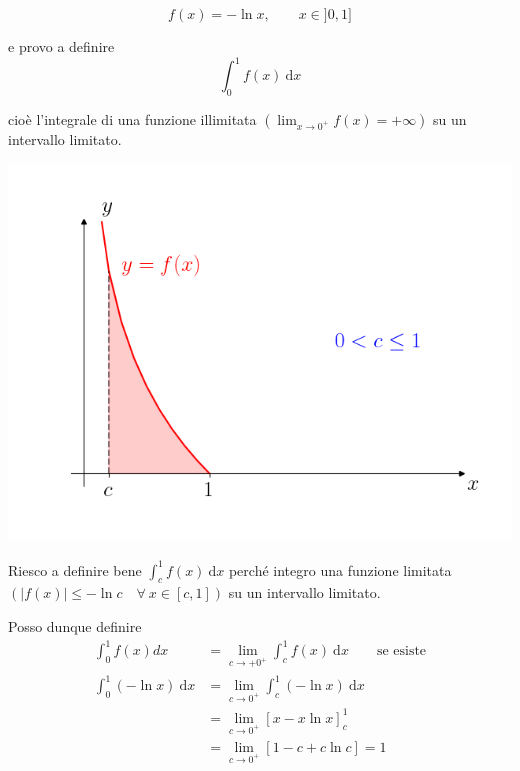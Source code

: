 	
\begin{exbar}
\begin{example}
	\begin{equation*}
		f(x)=-\ln x, \qquad x \in ]0,1]
	\end{equation*}
	
	e provo a definire 
	\begin{equation*}
		\int_{0}^{1} f(x) \ \mathrm{d}x
	\end{equation*}
	
	cioè l'integrale di una funzione illimitata $\left( \lim_{x \rightarrow 0^+} f(x) = + \infty \right)$ su un intervallo limitato.
	\begin{center}
		\includegraphics[width=0.75\linewidth]{integrali_impropri/pag79}
		\label{fig:pag79}
	\end{center}
	
	Riesco a definire bene $\int_{c}^{1} f(x) \ \mathrm{d}x$ perché integro una funzione limitata
	$\left( |f(x)|\leq -\ln c \quad \forall \ x \in [c,1] \right)$ su un intervallo limitato.
	
	Posso dunque definire
	\begin{align*}
		\int_{0}^{1} f(x)dx 
		&= \lim_{c\rightarrow +0^+} \int_{c}^{1} f(x) \ \mathrm{d}x \qquad \text{se esiste}
		\\
		\int_{0}^{1}(-\ln x) \ \mathrm{d}x 
		&= \lim_{c \rightarrow 0^+} \int_{c}^{1} (-\ln x) \ \mathrm{d} x
		\\
		&= \lim_{c \rightarrow 0^+} [x-x\ln x]_{c}^{1} 
		\\
		&= \lim_{c \rightarrow 0^+} [1-c+c\ln c]=1
	\end{align*}
\end{example}
\end{exbar}

